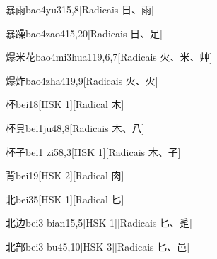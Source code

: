 \begin{entry}{暴雨}{bao4yu3}{15,8}[Radicais ⽇、⾬]
\end{entry}

\begin{entry}{暴躁}{bao4zao4}{15,20}[Radicais ⽇、⾜]
\end{entry}

\begin{entry}{爆米花}{bao4mi3hua1}{19,6,7}[Radicais ⽕、⽶、⾋]
\end{entry}

\begin{entry}{爆炸}{bao4zha4}{19,9}[Radicais ⽕、⽕]
\end{entry}

\begin{entry}{杯}{bei1}{8}[HSK 1][Radical ⽊]
\end{entry}

\begin{entry}{杯具}{bei1ju4}{8,8}[Radicais ⽊、⼋]
\end{entry}

\begin{entry}{杯子}{bei1 zi5}{8,3}[HSK 1][Radicais ⽊、⼦]
\end{entry}

\begin{entry}{背}{bei1}{9}[HSK 2][Radical ⾁]
\end{entry}

\begin{entry}{北}{bei3}{5}[HSK 1][Radical ⼔]
\end{entry}

\begin{entry}{北边}{bei3 bian1}{5,5}[HSK 1][Radicais ⼔、⾡]
\end{entry}

\begin{entry}{北部}{bei3 bu4}{5,10}[HSK 3][Radicais ⼔、⾢]
\end{entry}

